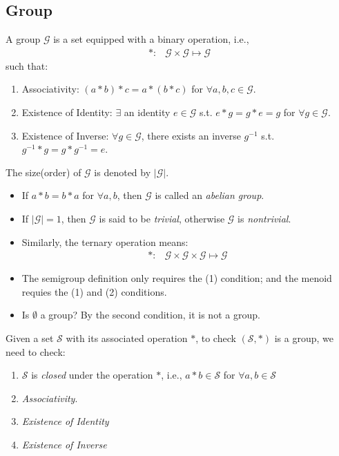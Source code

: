 \subsection{Group}
\begin{definition}[Group]\label{Def:1:1}
A group $\mathcal{G}$ is a set equipped with a binary operation, i.e.,
\[
\begin{array}{ll}
*:
&
\mathcal{G}\times\mathcal{G}\mapsto
\mathcal{G}
\end{array}
\]
such that:
\begin{enumerate}
\item
Associativity: 
$(a*b)*c = a*(b*c)$ for $\forall a,b,c\in\mathcal{G}.$
\item
Existence of Identity: 
$\exists$ an identity $e\in\mathcal{G}$ s.t. $e*g = g*e = g$ for $\forall g\in\mathcal{G}$.
\item
Existence of Inverse: 
$\forall g\in\mathcal{G}$, there exists an inverse $g^{-1}$ s.t. $g^{-1}* g=g*g^{-1} = e$.
\end{enumerate}
The size(order) of $\mathcal{G}$ is denoted by $|\mathcal{G}|$.
\end{definition}
\begin{remark}
\begin{itemize}
\item
If $a*b=b*a$ for $\forall a,b$, then $\mathcal{G}$ is called an \emph{abelian group}.
\item
If $|\mathcal{G}|=1$, then $\mathcal{G}$ is said to be \emph{trivial}, otherwise $\mathcal{G}$ is \emph{nontrivial}.  
\item
Similarly, the ternary operation means:
\[
\begin{array}{ll}
*:
&
\mathcal{G}\times\mathcal{G}\times\mathcal{G}\mapsto
\mathcal{G}
\end{array}
\]
\item
The semigroup definition only requires the (1) condition; and the menoid requies the (1) and (2) conditions.
\item
Is $\emptyset$ a group? By the second condition, it is not a group.
\end{itemize}
\end{remark}
Given a set $\mathcal{S}$ with its associated operation $*$, to check $(\mathcal{S},*)$ is a group, we need to check:
\begin{enumerate}
\item
$\mathcal{S}$ is \emph{closed} under the operation $*$, i.e., $a*b\in\mathcal{S}$ for $\forall a,b\in\mathcal{S}$
\item
\emph{Associativity}.
\item
\emph{Existence of Identity}
\item
\emph{Existence of Inverse}
\end{enumerate}

